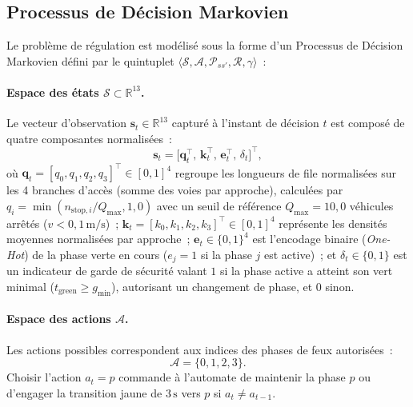 \documentclass[10pt,twocolumn,letterpaper]{article}
\begin{document}
\subsection{Processus de Décision Markovien}
Le problème de régulation est modélisé sous la forme d'un Processus de Décision Markovien défini par le quintuplet $\langle \mathcal{S}, \mathcal{A}, \mathcal{P}_{ss'}, \mathcal{R}, \gamma \rangle$~:

\paragraph{Espace des états $\mathcal{S} \subset \mathbb{R}^{13}$.}
Le vecteur d'observation $\mathbf{s}_t \in \mathbb{R}^{13}$ capturé à l'instant de décision $t$ est composé de quatre composantes normalisées~:
\begin{equation}
\mathbf{s}_t = \big[ \mathbf{q}_t^{\top}, \, \mathbf{k}_t^{\top}, \, \mathbf{e}_t^{\top}, \, \delta_t \big]^{\top},
\end{equation}
où $\mathbf{q}_t = [q_0, q_1, q_2, q_3]^{\top} \in [0, 1]^4$ regroupe les longueurs de file normalisées sur les 4 branches d'accès (somme des voies par approche), calculées par $q_i = \min(n_{\text{stop}, i} / Q_{\max}, 1{,}0)$ avec un seuil de référence $Q_{\max} = 10{,}0$ véhicules arrêtés ($v < 0{,}1\,\mathrm{m/s}$)~; $\mathbf{k}_t = [k_0, k_1, k_2, k_3]^{\top} \in [0, 1]^4$ représente les densités moyennes normalisées par approche~; $\mathbf{e}_t \in \{0, 1\}^4$ est l'encodage binaire (\emph{One-Hot}) de la phase verte en cours ($e_j = 1$ si la phase $j$ est active)~; et $\delta_t \in \{0, 1\}$ est un indicateur de garde de sécurité valant $1$ si la phase active a atteint son vert minimal ($t_{\text{green}} \ge g_{\min}$), autorisant un changement de phase, et $0$ sinon.

\paragraph{Espace des actions $\mathcal{A}$.}
Les actions possibles correspondent aux indices des phases de feux autorisées~:
\begin{equation}
\mathcal{A} = \{0, 1, 2, 3\}.
\end{equation}
Choisir l'action $a_t = p$ commande à l'automate de maintenir la phase $p$ ou d'engager la transition jaune de $3\,\mathrm{s}$ vers $p$ si $a_t \neq a_{t-1}$.
\end{document}
